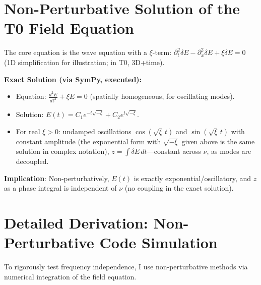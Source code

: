 	\section{Non-Perturbative Solution of the T0 Field Equation}
	
	The core equation is the wave equation with a $\xi$-term: $\partial_t^2 \delta E - \partial_x^2 \delta E + \xi \delta E = 0$ (1D simplification for illustration; in T0, 3D+time).
	
	\textbf{Exact Solution (via SymPy, executed):}
	\begin{itemize}
		\item Equation: $\frac{d^2 E}{dt^2} + \xi E = 0$ (spatially homogeneous, for oscillating modes).
		\item Solution: $ E(t) = C_1 e^{-t \sqrt{-\xi}} + C_2 e^{t \sqrt{-\xi}} $.
		\item For real $\xi > 0$: undamped oscillations $\cos(\sqrt{\xi}\,t)$ and $\sin(\sqrt{\xi}\,t)$ with constant amplitude (the exponential form with $\sqrt{-\xi}$ given above is the same solution in complex notation), $z = \int \delta E \, dt$—constant across $\nu$, as modes are decoupled.
	\end{itemize}
	
	\textbf{Implication}: Non-perturbatively, $E(t)$ is exactly exponential/oscillatory, and $z$ as a phase integral is independent of $\nu$ (no coupling in the exact solution).
	
	\section{Detailed Derivation: Non-Perturbative Code Simulation}
	
	To rigorously test frequency independence, I use non-perturbative methods via numerical integration of the field equation.
	
